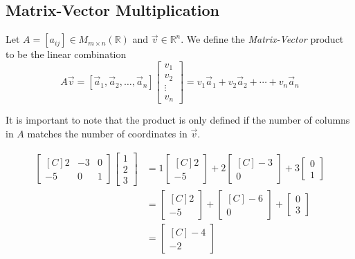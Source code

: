 \subsection{Matrix-Vector Multiplication}

\begin{definition}
Let $A=[a_{ij}]\in M_{m\times n}(\mathbb{R})$ and $\vec{v} \in \mathbb{R}^n$.  
We define the \emph{Matrix-Vector} product to be the linear combination 
\[
A\vec{v}=[\vec{a}_1, \vec{a}_2, \ldots ,\vec{a}_n]\begin{bmatrix}v_1 \\ v_2 \\ 
\vdots \\ v_n \end{bmatrix}=v_1\vec{a}_1+v_2\vec{a}_2+\cdots+v_n\vec{a}_n
\]
\end{definition} 
\begin{remark}
It is important to note that the product is only defined if the number of columns in $A$ matches the number of coordinates in $\vec{v}$.
\end{remark}

\begin{example}\label{ex:mv_mult_by_def}
\begin{align*}
\begin{bmatrix*}[C]
2 & -3 & 0 \\
-5 & 0 & 1 
\end{bmatrix*} 
\begin{bmatrix}1\\ 2 \\ 3 \end{bmatrix}
&=1\begin{bmatrix*}[C]2\\-5\end{bmatrix*} 
+2\begin{bmatrix*}[C]-3\\0\end{bmatrix*} 
+3\begin{bmatrix}0\\1\end{bmatrix}\\
&=\begin{bmatrix*}[C]2\\-5\end{bmatrix*}
+\begin{bmatrix*}[C]-6\\0\end{bmatrix*}+\begin{bmatrix}0\\3\end{bmatrix}\\
&=\begin{bmatrix*}[C]-4\\-2\end{bmatrix*}
\end{align*}
\end{example}

